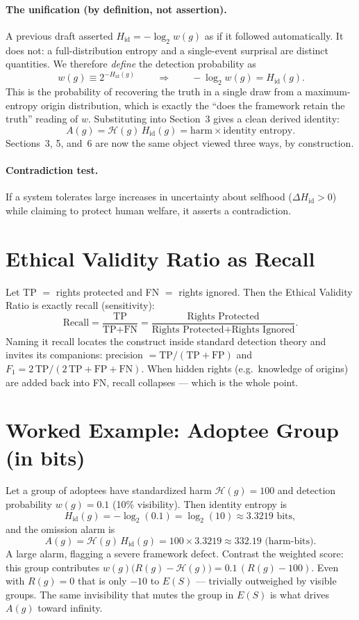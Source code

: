 \documentclass[12pt,a4paper]{article}
\begin{document}
\paragraph{The unification (by definition, not assertion).}
A previous draft asserted $H_{\mathrm{id}} = -\log_2 w(g)$ as if it followed
automatically. It does not: a full-distribution entropy and a single-event
surprisal are distinct quantities. We therefore \emph{define} the detection
probability as
\[
\boxed{\,w(g) \equiv 2^{-H_{\mathrm{id}}(g)}\,}
\qquad\Longrightarrow\qquad
-\log_2 w(g) = H_{\mathrm{id}}(g).
\]
This is the probability of recovering the truth in a single draw from a
maximum-entropy origin distribution, which is exactly the ``does the framework
retain the truth'' reading of $w$. Substituting into Section~3 gives a clean
derived identity:
\[
A(g) = \mathcal{H}(g)\,H_{\mathrm{id}}(g)
     = \text{harm} \times \text{identity entropy}.
\]
Sections~3, 5, and~6 are now the same object viewed three ways, by
construction.

\paragraph{Contradiction test.} If a system tolerates large increases in
uncertainty about selfhood ($\Delta H_{\mathrm{id}} > 0$) while claiming to
protect human welfare, it asserts a contradiction.

\section{Ethical Validity Ratio as Recall}
Let TP $=$ rights protected and FN $=$ rights ignored. Then the Ethical
Validity Ratio is exactly recall (sensitivity):
\[
\text{Recall} = \frac{\text{TP}}{\text{TP}+\text{FN}}
= \frac{\text{Rights Protected}}{\text{Rights Protected}+\text{Rights Ignored}}.
\]
Naming it recall locates the construct inside standard detection theory and
invites its companions: precision $=\text{TP}/(\text{TP}+\text{FP})$ and
$F_1 = 2\,\text{TP}/(2\,\text{TP}+\text{FP}+\text{FN})$. When hidden rights
(e.g.\ knowledge of origins) are added back into FN, recall collapses --- which
is the whole point.

\section{Worked Example: Adoptee Group (in bits)}
Let a group of adoptees have standardized harm $\mathcal{H}(g)=100$ and
detection probability $w(g)=0.1$ (10\% visibility). Then identity entropy is
\[
H_{\mathrm{id}}(g) = -\log_2(0.1) = \log_2(10) \approx 3.3219 \text{ bits},
\]
and the omission alarm is
\[
A(g) = \mathcal{H}(g)\,H_{\mathrm{id}}(g)
     = 100 \times 3.3219 \approx 332.19 \text{ (harm-bits)}.
\]
A large alarm, flagging a severe framework defect. Contrast the weighted
score: this group contributes $w(g)\bigl(R(g)-\mathcal{H}(g)\bigr)
= 0.1\,(R(g)-100)$. Even with $R(g)=0$ that is only $-10$ to $E(S)$ ---
trivially outweighed by visible groups. The same invisibility that mutes the
group in $E(S)$ is what drives $A(g)$ toward infinity.
\end{document}
